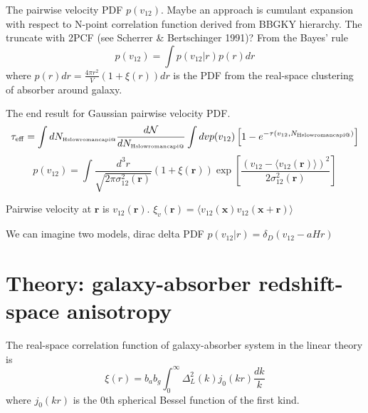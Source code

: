 \documentclass[useAMS,usenatbib,twocolumn]{mn2e}
\makeatletter
\newcommand{\Rmnum}[1]{\expandafter\@slowromancap\romannumeral #1@}
\newcommand{\NHI}{N_{\mbox{\tiny H\Rmnum{1}}}}
\makeatother
\begin{document}
The pairwise velocity PDF $p(v_{12})$. Maybe an approach is cumulant
expansion with respect to N-point correlation function derived from 
BBGKY hierarchy. The truncate with 2PCF (see Scherrer \& Bertschinger 1991)? 
From the Bayes' rule 
\begin{equation}
p(v_{12})=\int p(v_{12}|r)p(r)dr
\end{equation}
where $p(r)dr=\frac{4\pi r^2}{V}(1+\xi(r))dr$ is the PDF from the 
real-space clustering of absorber around galaxy.

The end result for Gaussian pairwise velocity PDF.
\begin{equation}
\tau_{\rm{eff}}=\int d\NHI\frac{d\mathcal{N}}{d\NHI}
\int dv p(v_{12})\left[1-e^{-\tau(v_{12},\NHI)}\right]
\end{equation}
\begin{equation}
p(v_{12})=\int \frac{d^3r}{\sqrt{2\pi\sigma_{12}^2(\boldsymbol{r})}}
\left(1+\xi(\boldsymbol{r})\right)
\exp\left[\frac{(v_{12}-\langle v_{12}(\boldsymbol{r})\rangle)^2}
{2\sigma_{12}^2(\boldsymbol{r})}\right]
\end{equation}

Pairwise velocity at $\boldsymbol{r}$ is $v_{12}(\boldsymbol{r})$.
$\xi_v(\boldsymbol{r})=\langle v_{12}(\boldsymbol{x})
v_{12}(\boldsymbol{x}+\boldsymbol{r})\rangle$

We can imagine two models, dirac delta PDF $p(v_{12}|r)=\delta_D(v_{12}-aHr)$





\section{Theory: galaxy-absorber redshift-space anisotropy}
The real-space correlation function of galaxy-absorber system
in the linear theory is
\begin{equation}
\xi(r)=b_a b_g\int_0^\infty\Delta_L^2(k)j_0(kr)\frac{dk}{k}
\end{equation}
where $j_0(kr)$ is the 0th spherical Bessel function of the first kind.
\end{document}
